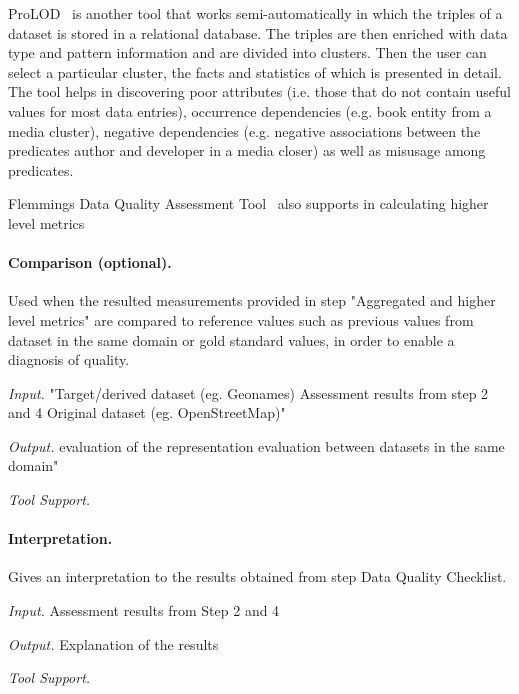 ProLOD~\cite{Bohm} is another tool that works semi-automatically  in which the triples of a dataset is stored in a relational database. 
The triples are then enriched with data type and pattern information and are divided into clusters.
Then the user can select a particular cluster, the facts and statistics of which is presented in detail. 
The tool helps in discovering poor attributes (i.e. those that do not contain useful values for most data entries), occurrence dependencies (e.g. book entity from a media cluster), negative dependencies (e.g. negative associations between the predicates author and developer in a media closer) as well as misusage among predicates.

Flemmings Data Quality Assessment Tool~\cite{Flemming} also supports in calculating higher level metrics 


\paragraph{\textbf{Comparison (optional).}}
Used when the resulted measurements provided in step "Aggregated and higher level metrics" are compared to reference values such as previous values from dataset in the same domain or gold standard values, in order to enable a diagnosis of quality. 

\emph{Input.} 
"Target/derived dataset (eg. Geonames)
Assessment results from step 2 and 4
Original dataset (eg. OpenStreetMap)"

\emph{Output.} 
evaluation of the representation
evaluation between datasets in the same domain"

\emph{Tool Support.} 

\paragraph{\textbf{Interpretation.}}
Gives an interpretation to the results obtained from step Data Quality Checklist.

\emph{Input.} 
Assessment results from Step 2 and 4

\emph{Output.} 
Explanation of the results

\emph{Tool Support.} 

